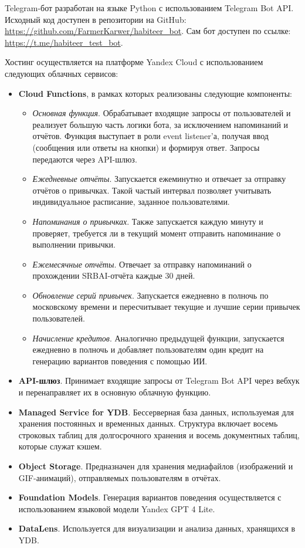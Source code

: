 \documentclass[pdflatex,sn-mathphys-num]{sn-jnl}%
\theoremstyle{thmstyleone}%
\theoremstyle{thmstyletwo}%
\theoremstyle{thmstylethree}%
\begin{document}
Telegram-бот разработан на языке Python с использованием Telegram Bot API. Исходный код доступен в репозитории на GitHub: \url{https://github.com/FarmerKarwer/habiteer_bot}. Сам бот доступен по ссылке: \url{https://t.me/habiteer_test_bot}.

Хостинг осуществляется на платформе Yandex Cloud с использованием следующих облачных сервисов:

\begin{itemize}
    \item \textbf{Cloud Functions}, в рамках которых реализованы следующие компоненты:
    \begin{itemize}
        \item \textit{Основная функция}. Обрабатывает входящие запросы от пользователей и реализует большую часть логики бота, за исключением напоминаний и отчётов. Функция выступает в роли event listener'а, получая ввод (сообщения или ответы на кнопки) и формируя ответ. Запросы передаются через API-шлюз.
        \item \textit{Ежедневные отчёты}. Запускается ежеминутно и отвечает за отправку отчётов о привычках. Такой частый интервал позволяет учитывать индивидуальное расписание, заданное пользователями.
        \item \textit{Напоминания о привычках}. Также запускается каждую минуту и проверяет, требуется ли в текущий момент отправить напоминание о выполнении привычки.
        \item \textit{Ежемесячные отчёты}. Отвечает за отправку напоминаний о прохождении SRBAI-отчёта каждые 30 дней.
        \item \textit{Обновление серий привычек}. Запускается ежедневно в полночь по московскому времени и пересчитывает текущие и лучшие серии привычек пользователей.
        \item \textit{Начисление кредитов}. Аналогично предыдущей функции, запускается ежедневно в полночь и добавляет пользователям один кредит на генерацию вариантов поведения с помощью ИИ.
    \end{itemize}
    
    \item \textbf{API-шлюз}. Принимает входящие запросы от Telegram Bot API через вебхук и перенаправляет их в основную облачную функцию.
    
    \item \textbf{Managed Service for YDB}. Бессерверная база данных, используемая для хранения постоянных и временных данных. Структура включает восемь строковых таблиц для долгосрочного хранения и восемь документных таблиц, которые служат кэшем.
    
    \item \textbf{Object Storage}. Предназначен для хранения медиафайлов (изображений и GIF-анимаций), отправляемых пользователям в отчётах.
    
    \item \textbf{Foundation Models}. Генерация вариантов поведения осуществляется с использованием языковой модели Yandex GPT 4 Lite.
    
    \item \textbf{DataLens}. Используется для визуализации и анализа данных, хранящихся в YDB.
\end{itemize}
\end{document}

